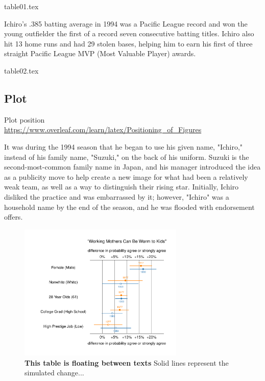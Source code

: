 \documentclass[12pt]{article}
\theoremstyle{hypotheses}
\begin{document}
{table01.tex}

Ichiro's .385 batting average in 1994 was a Pacific League record and won the young outfielder the first of a record seven consecutive batting titles. Ichiro also hit 13 home runs and had 29 stolen bases, helping him to earn his first of three straight Pacific League MVP (Most Valuable Player) awards.

{table02.tex}


\subsection*{Plot}
Plot position\\
\url{https://www.overleaf.com/learn/latex/Positioning_of_Figures}

It was during the 1994 season that he began to use his given name, "Ichiro," instead of his family name, "Suzuki," on the back of his uniform. Suzuki is the second-most-common family name in Japan, and his manager introduced the idea as a publicity move to help create a new image for what had been a relatively weak team, as well as a way to distinguish their rising star. Initially, Ichiro disliked the practice and was embarrassed by it; however, "Ichiro" was a household name by the end of the season, and he was flooded with endorsement offers.

\begin{figure}[H] %
  \begin{center}
      \includegraphics[width=0.7\textwidth]{plots/mothersFD7789.pdf} 
      \vspace{-2.5em}
      \caption{\textbf{This table is floating between texts} Solid lines represent the simulated change...}
      \label{fig:FloatingPlot}
  \end{center}
\end{figure} 
\end{document}
